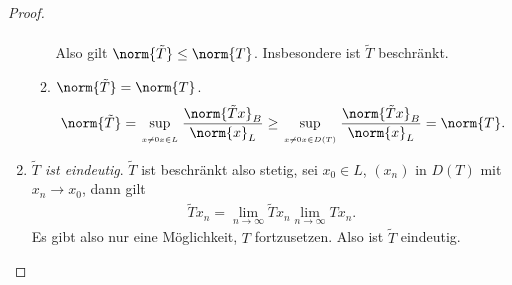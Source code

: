 \begin{proof}
\begin{enumerate}[label=\arabic{*}.)]
\begin{enumerate}[label=\alph{*})]
\begin{align*}
\end{align*}
Also gilt $\norm{\tilde{T}}\le\norm{T}$. Insbesondere ist $\tilde{T}$
beschränkt.
\item $\norm{\tilde{T}}=\norm{T}$.
\begin{align*}
\norm{\tilde{T}} = \sup\limits_{\atop{x\neq 0}{x\in L}}
\frac{\norm{\tilde{T}x}_B}{\norm{x}_L} \ge
\sup\limits_{\atop{x\neq 0}{x\in D(T)}}
\frac{\norm{\tilde{T}x}_B}{\norm{x}_L} =\norm{T}.
\end{align*}
\end{enumerate}
\item \textit{$\tilde{T}$ ist eindeutig}. $\tilde{T}$ ist beschränkt also
stetig, sei $x_0\in L$, $(x_n)$ in $D(T)$ mit $x_n\to x_0$, dann gilt
\begin{align*}
\tilde{T}x_n = \lim\limits_{n\to\infty} \tilde{T}x_n \lim\limits_{n\to\infty}
Tx_n. 
\end{align*}
Es gibt also nur eine Möglichkeit, $T$ fortzusetzen.
Also ist $\tilde{T}$ eindeutig.\qedhere
\end{enumerate}
\end{proof}


